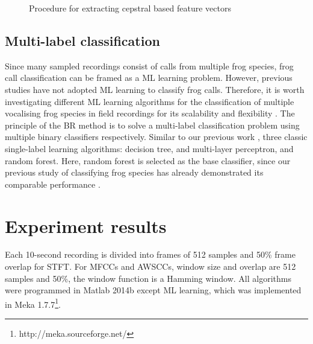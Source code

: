 \begin{figure}[htb!] %
\caption[Spectral clustering for cepstral feature extraction]{Procedure for extracting cepstral based feature vectors}
\label{fig:spectralClustering} 
\end{figure}





\subsection{Multi-label classification} 
Since many sampled recordings consist of calls from multiple frog species, frog call classification can be framed as a ML learning problem. However, previous studies have not adopted ML learning to classify frog calls. Therefore, it is worth investigating different ML learning algorithms for the classification of multiple vocalising frog species in field recordings for its scalability and flexibility \citep{read2011classifier}. The principle of the BR method is to solve a multi-label classification problem using multiple binary classifiers respectively. Similar to our previous work \citep{zhang2016using}, 
three classic single-label learning algorithms: decision tree, and multi-layer perceptron, and random forest. Here, random forest is selected as the base classifier, since our previous study of classifying frog species has already demonstrated its comparable performance \citep{xie2016acoustic}. 

\section{Experiment results}
Each 10-second recording is divided into frames of 512 samples and 50\% frame overlap for STFT. For MFCCs and AWSCCs, window size and overlap are 512 samples and 50\%, the window function is a Hamming window. All algorithms were programmed in Matlab 2014b except ML learning, which was implemented in Meka 1.7.7\footnote[4]{http://meka.sourceforge.net/}. 







